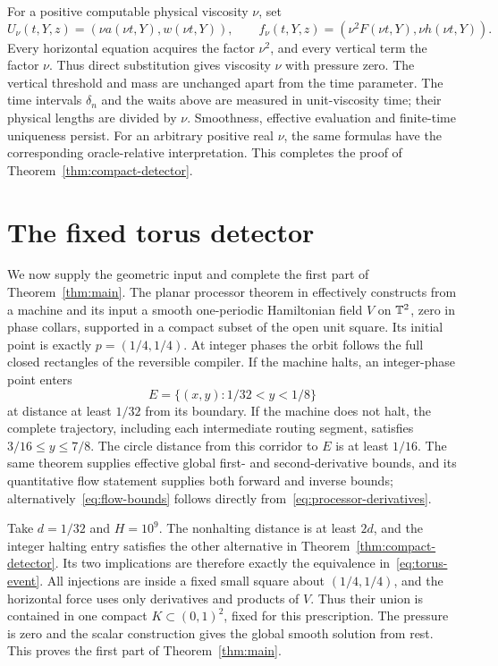 For a positive computable physical viscosity $\nu$, set
\begin{equation}\label{eq:compact-viscosity}
 U_\nu(t,Y,z)=(\nu a(\nu t,Y),w(\nu t,Y)),\qquad
 f_\nu(t,Y,z)=(\nu^2F(\nu t,Y),\nu h(\nu t,Y)).
\end{equation}
Every horizontal equation acquires the factor $\nu^2$, and every
vertical term the factor $\nu$. Thus direct substitution gives
viscosity $\nu$ with pressure zero. The vertical threshold and mass
are unchanged apart from the time parameter. The time intervals
$\delta_n$ and the waits above are measured in unit-viscosity time;
their physical lengths are divided by $\nu$. Smoothness, effective
evaluation and finite-time uniqueness persist. For an arbitrary
positive real $\nu$, the same formulas have the corresponding
oracle-relative interpretation. This completes the proof of
Theorem~\ref{thm:compact-detector}.

\section{The fixed torus detector}\label{sec:compact-application}

We now supply the geometric input and complete the first part of
Theorem~\ref{thm:main}. The planar processor theorem in
\cite[Theorem~4.1]{stationary2026} effectively constructs from a machine
and its input a smooth one-periodic Hamiltonian field $V$ on $\mathbb T^2$,
zero in phase collars, supported in a compact subset of the open unit
square. Its initial point is exactly $p=(1/4,1/4)$. At integer phases
the orbit follows the full closed rectangles of the reversible
compiler. If the machine halts, an integer-phase point enters
\[
 E=\{(x,y):1/32<y<1/8\}
\]
at distance at least $1/32$ from its boundary. If the machine does
not halt, the complete trajectory, including each intermediate
routing segment, satisfies $3/16\le y\le7/8$.
The circle distance from this corridor to $E$ is at least $1/16$.
The same theorem supplies effective global first- and second-derivative
bounds, and its quantitative flow statement supplies both forward and
inverse bounds; alternatively~\eqref{eq:flow-bounds} follows directly
from~\eqref{eq:processor-derivatives}.

Take $d=1/32$ and $H=10^9$. The nonhalting distance is at least $2d$,
and the integer halting entry satisfies the other alternative in
Theorem~\ref{thm:compact-detector}. Its two implications are therefore
exactly the equivalence in~\eqref{eq:torus-event}. All injections are
inside a fixed small square about $(1/4,1/4)$, and the horizontal
force uses only derivatives and products of $V$. Thus their union
is contained in one compact $K\subset(0,1)^2$, fixed for this
prescription. The pressure is zero and the scalar construction gives
the global smooth solution from rest. This proves the first part of
Theorem~\ref{thm:main}.

